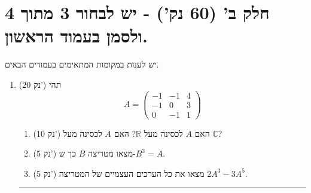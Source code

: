 \documentclass[12pt, a4paper]{article}
\newcommand{\cc}{\mathbb{C}}
\newcommand{\rr}{\mathbb{R}}
\newcommand{\points}[1]{(#1 נק') }
\begin{document}

 \pagebreak

\section*{חלק ב' (60 נק') - יש לבחור 3 מתוך 4 ולסמן בעמוד הראשון.}
יש לענות במקומות המתאימים בעמודים הבאים.
\begin{enumerate}
\newcommand{\firstQ}{
\item \points{20}
תהי
\[A = \begin{pmatrix}
    -1 & -1 & 4\\
    -1 & 0 & 3\\
    0 & -1 & 1
\end{pmatrix} \]
\begin{enumerate}
    \item\points{10} האם $A$ לכסינה מעל $\rr$?
    האם $A$ לכסינה מעל $\cc$?
    \item\points{5} מצאו מטריצה $B$ כך ש-$B^{3}=A$.
    \item\points{5} מצאו את כל הערכים העצמיים של המטריצה
    $2A^3-3A^5$.
\end{enumerate}

}
\firstQ
\noindent\rule{\textwidth-30pt}{0.4pt}

\newcommand{\secondQ}{
\item\points{20}
יהיו $a,b\in\mathbb{R}$, ותהי $T:\mathbb{R}^3\to\mathbb{R}^3$ העתקה לינארית המקיימת
\[
T\!\begin{pmatrix}1\\1\\1\end{pmatrix}=\begin{pmatrix}1\\1\\0\end{pmatrix},
\qquad
T\!\begin{pmatrix}1\\1\\0\end{pmatrix}=\begin{pmatrix}a\\1\\0\end{pmatrix},
\qquad
T\!\begin{pmatrix}1\\0\\0\end{pmatrix}=\begin{pmatrix}1\\1\\b\end{pmatrix}.
\]

}
\end{enumerate}
\end{document}
